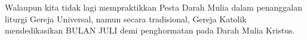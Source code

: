  

Walaupun kita tidak lagi mempraktikkan Pesta Darah Mulia dalam penanggalan liturgi Gereja Universal, namun secara tradisional, Gereja Katolik mendedikasikan BULAN JULI demi penghormatan pada Darah Mulia Kristus.

